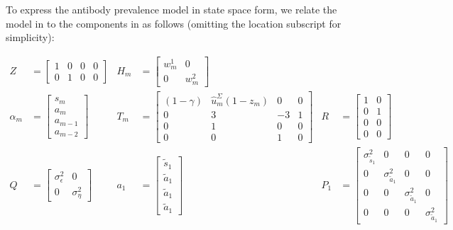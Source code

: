 
To express the antibody prevalence model in state space form, we relate the
model in  to the components in
 as follows (omitting the location subscript for
simplicity):
\begin{linenomath*}
\begin{align*}
    Z &= \begin{bmatrix} 1 & 0 & 0 & 0 \\ 0 & 1 & 0 & 0 \end{bmatrix} &
    H_m &= \begin{bmatrix}w^1_{m} & 0 \\ 0 & w^2_{m} \end{bmatrix} \\
    \alpha_m &= \begin{bmatrix}s_{m} \\ a_m \\ a_{m-1}\\ a_{m-2} \end{bmatrix} & 
    T_m &= \begin{bmatrix}(1 - \gamma) & \widehat{u}^\Sigma_{m} (1 - z_m) & 0 & 0\\ 
        0 & 3 & -3 & 1 \\ 0 & 1 & 0 & 0\\ 0 & 0 & 1 & 0 \end{bmatrix}  & 
    R &= \begin{bmatrix}1 & 0  \\ 0 & 1 \\ 0 & 0 \\ 0 & 0 \end{bmatrix}\\
    Q &= \begin{bmatrix} \sigma^2_\epsilon & 0  \\ 0 & \sigma^2_\eta \end{bmatrix} &
    a_1 &= \begin{bmatrix} \tilde{s}_{1}\\ \tilde{a}_1\\ \tilde{a}_1 \\ \tilde{a}_1 \end{bmatrix} & 
    P_{1} &= \begin{bmatrix} \sigma^2_{\tilde{s}_{1}} & 0 & 0 & 0 \\ 
    0 & \sigma^2_{\tilde{a}_1} & 0 & 0\\ 0 & 0 & \sigma^2_{\tilde{a}_1} & 0 \\ 
    0 & 0 & 0 & \sigma^2_{\tilde{a}_1} \end{bmatrix} 
\end{align*}
\end{linenomath*}
